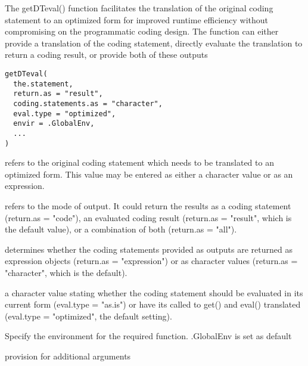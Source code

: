 \documentclass[a4paper]{book}
\begin{document}
%
\begin{Description}\relax
The getDTeval() function facilitates the translation of the original coding statement to an optimized form for improved runtime efficiency without compromising on the programmatic coding design.  The function can either provide a translation of the coding statement, directly evaluate the translation to return a coding result, or provide both of these outputs
\end{Description}
%
\begin{Usage}
\begin{verbatim}
getDTeval(
  the.statement,
  return.as = "result",
  coding.statements.as = "character",
  eval.type = "optimized",
  envir = .GlobalEnv,
  ...
)
\end{verbatim}
\end{Usage}
%
\begin{Arguments}
\begin{ldescription}
\item[\code{the.statement}] refers to the original coding statement which needs to be translated to an optimized form.  This value may be entered as either a character value or as an expression.

\item[\code{return.as}] refers to the mode of output. It could return the results as a coding statement (return.as = "code"), an evaluated coding result (return.as = "result", which is the default value), or a combination of both (return.as = "all").

\item[\code{coding.statements.as}] determines whether the coding statements provided as outputs are returned as expression objects (return.as = "expression") or as character values (return.as = "character", which is the default).

\item[\code{eval.type}] a character value stating whether the coding statement should be evaluated in its current form (eval.type = "as.is") or have its called to get() and eval() translated (eval.type = "optimized", the default setting).

\item[\code{envir}] Specify the environment for the required function. .GlobalEnv is set as default

\item[\code{...}] provision for additional arguments
\end{ldescription}
\end{Arguments}
\end{document}
